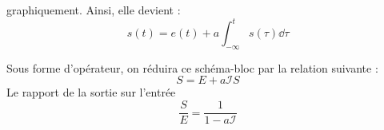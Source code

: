 graphiquement. Ainsi, elle devient :
\[
    s(t)=e(t)+a\int_{-\infty}^t s(\tau) \dd{\tau}
\]
\begin{center}
    
\end{center}
Sous forme d'opérateur, on réduira ce schéma-bloc par 
la relation suivante :
\[
    S=E+a\mathcal{I}S
\]
Le rapport de la sortie sur l'entrée
\[
    \dfrac{S}{E}=\dfrac{1}{1-a\mathcal{I}}
\]
